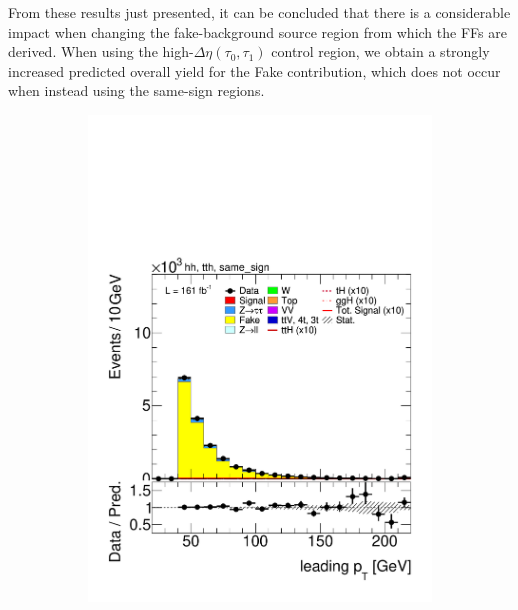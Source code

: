 From these results just presented, it can be concluded that there is a considerable impact when changing the fake-\tauhad background source region from which the FFs are derived. When using the high-$\Delta\eta(\tau_0,\tau_1)$ control region, we obtain a strongly increased predicted overall yield for the Fake contribution, which does not occur when instead using the same-sign regions.
\begin{figure}[htbp]
  \centering
  \begin{subfigure}[b]{0.45\textwidth}
    \centering
    \includegraphics[width=\textwidth]{images/same_sign_same_sign_run3/plot_tau_0_pt_hh_tth_22_23_24_same_sign.pdf}
    \caption{}
  \end{subfigure}
  \hfill
  \begin{subfigure}[b]{0.45\textwidth}
    \centering

\end{subfigure}
\end{figure}
